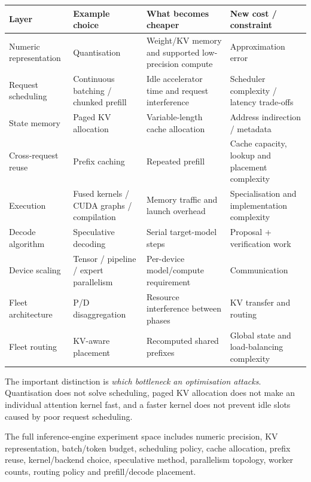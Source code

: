 \begin{center}
\small
\begin{tabularx}{.98\linewidth}{@{}L{.18\linewidth}L{.23\linewidth}YY@{}}
\toprule
\textbf{Layer} & \textbf{Example choice} & \textbf{What becomes cheaper} & \textbf{New cost / constraint} \\
\midrule
Numeric representation
& Quantisation
& Weight/KV memory and supported low-precision compute
& Approximation error \\
Request scheduling
& Continuous batching / chunked prefill
& Idle accelerator time and request interference
& Scheduler complexity / latency trade-offs \\
State memory
& Paged KV allocation
& Variable-length cache allocation
& Address indirection / metadata \\
Cross-request reuse
& Prefix caching
& Repeated prefill
& Cache capacity, lookup and placement complexity \\
Execution
& Fused kernels / CUDA graphs / compilation
& Memory traffic and launch overhead
& Specialisation and implementation complexity \\
Decode algorithm
& Speculative decoding
& Serial target-model steps
& Proposal + verification work \\
Device scaling
& Tensor / pipeline / expert parallelism
& Per-device model/compute requirement
& Communication \\
Fleet architecture
& P/D disaggregation
& Resource interference between phases
& KV transfer and routing \\
Fleet routing
& KV-aware placement
& Recomputed shared prefixes
& Global state and load-balancing complexity \\
\bottomrule
\end{tabularx}
\end{center}

The important distinction is \emph{which bottleneck an optimisation attacks}.
Quantisation does not solve scheduling, paged KV allocation does not make an individual attention kernel fast, and a faster kernel does not prevent idle slots caused by poor request scheduling.

\begin{calloutdegreeofexperiment}
The full inference-engine experiment space includes numeric precision, KV representation, batch/token budget, scheduling policy, cache allocation, prefix reuse, kernel/backend choice, speculative method, parallelism topology, worker counts, routing policy and prefill/decode placement.
\end{calloutdegreeofexperiment}


